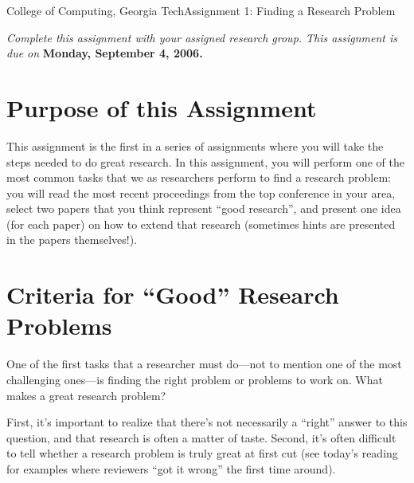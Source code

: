 \documentclass[11pt]{article}
\begin{document}


{College of Computing, Georgia Tech}{Assignment 1: Finding a Research Problem}

{\em Complete this assignment with your assigned research group.  This
  assignment is due on} {\bf Monday, September 4, 2006.}

\section{Purpose of this Assignment}

This assignment is the first in a series of assignments where you will
take the steps needed to do great research.  In this assignment, you
will perform one of the most common tasks that we as researchers perform
to find a research problem: you will read the most recent proceedings
from the top conference in your area, select two papers that you think
represent ``good research'', and present one idea (for each paper) on
how to extend that research (sometimes hints are presented in the papers
themselves!).


\section{Criteria for ``Good'' Research Problems}

One of the first tasks that a researcher must do---not to mention one of
the most challenging ones---is finding the right problem or problems to
work on.  What makes a great research problem?  

First, it's important to realize that there's not necessarily a
``right'' answer to this question, and that research is often a matter
of taste.  Second, it's often difficult to tell whether a research
problem is truly great at first cut (see today's reading for examples
where reviewers ``got it wrong'' the first time around).
\end{document}
